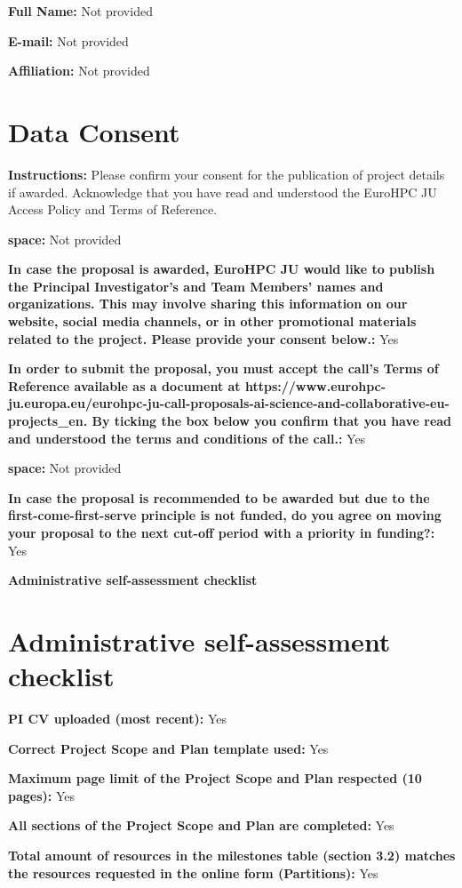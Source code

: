 \documentclass[12pt,a4paper]{article}
\begin{document}
\textbf{Full Name:} Not provided

\textbf{E-mail:} Not provided

\textbf{Affiliation:} Not provided

\section*{Data Consent}

\textbf{Instructions:} Please confirm your consent for the publication of project details if awarded. Acknowledge that you have read and understood the EuroHPC JU Access Policy and Terms of Reference.

\textbf{space:} Not provided

\textbf{In case the proposal is awarded, EuroHPC JU would like to publish the Principal Investigator’s and Team Members’ names and organizations. This may involve sharing this information on our website, social media channels, or in other promotional materials related to the project. Please provide your consent below.:} Yes

\textbf{In order to submit the proposal, you must accept the call's Terms of Reference available as a document at https://www.eurohpc-ju.europa.eu/eurohpc-ju-call-proposals-ai-science-and-collaborative-eu-projects\_en. By ticking the box below you confirm that you have read and understood the terms and conditions of the call.:} Yes



\textbf{space:} Not provided

\textbf{In case the proposal is recommended to be awarded but due to the first-come-first-serve principle is not funded, do you agree on moving your proposal to the next cut-off period with a priority in funding?:} Yes

\textbf{Administrative self-assessment checklist}

\section*{Administrative self-assessment checklist}

\textbf{PI CV uploaded (most recent):} Yes

\textbf{Correct Project Scope and Plan template used:} Yes

\textbf{Maximum page limit of the Project Scope and Plan respected (10 pages):} Yes

\textbf{All sections of the Project Scope and Plan are completed:} Yes

\textbf{Total amount of resources in the milestones table (section 3.2) matches the resources requested in the online form (Partitions):} Yes
\end{document}
